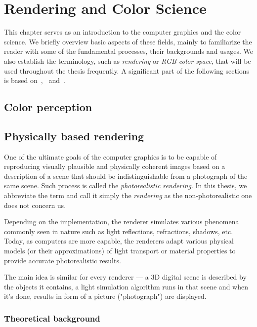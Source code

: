 \chapter{Rendering and Color Science}

This chapter serves as an introduction to the computer graphics and the color science. We briefly overview basic aspects of these fields, mainly to familiarize the reader with some of the fundamental processes, their backgrounds and usages. We also establish the terminology, such as \emph{rendering} or \emph{RGB color space}, that will be used throughout the thesis frequently. A significant part of the following sections is based on~\citet{wyszecki1982color},~\citet{nimier2019mitsuba} and~\citet{pharr2016physically}.

\section{Color perception}



\section{Physically based rendering}

One of the ultimate goals of the computer graphics is to be capable of reproducing visually plausible and physically coherent images based on a description of a scene that should be indistinguishable from a photograph of the same scene. Such process is called the \emph{photorealistic rendering}. In this thesis, we abbreviate the term and call it simply the \emph{rendering} as the non-photorealistic one does not concern us.

Depending on the implementation, the renderer simulates various phenomena commonly seen in nature such as light reflections, refractions, shadows, etc. Today, as computers are more capable, the renderers adapt various physical models (or their approximations) of light transport or material properties to provide accurate photorealistic results.

The main idea is similar for every renderer --- a 3D digital scene is described by the objects it contains, a light simulation algorithm runs in that scene and when it's done, results in form of a picture ("photograph") are displayed.

\subsection{Theoretical background}

